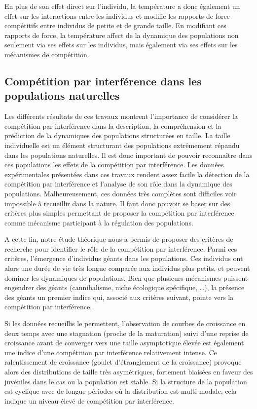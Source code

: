 En plus de son effet direct sur l'individu, la température a donc également un
effet sur les interactions entre les individus et modifie les rapports de force
compétitifs entre individus de petite et de grande taille. En modifiant ces
rapports de force, la température affect de la dynamique des populations non
seulement via ses effets sur les individus, mais également via ses effets sur
les mécanismes de compétition. 

\subsection{Compétition par interférence dans les populations
naturelles}

Les différents résultats de ces travaux montrent l'importance de considérer la
compétition par interférence dans la description, la compréhension et la
prédiction de la dynamiques des populations structurées en taille. La taille
individuelle est un élément structurant des populations extrêmement répandu dans
les populations naturelles. Il est donc important de pouvoir reconnaître dans
ces populations les effets de la compétition par interférence. Les données
expérimentales présentées dans ces travaux rendent assez facile la détection de
la compétition par interférence et l'analyse de son rôle dans la dynamique des
populations. Malheureusement, ces données très complètes sont difficiles voir
impossible à recueillir dans la nature. Il faut donc pouvoir se baser sur des
critères plus simples permettant de proposer la compétition par interférence
comme mécanisme participant à la régulation des populations. 

A cette fin, notre étude théorique nous a permis de proposer des critères de
recherche pour identifier le rôle de la compétition par interférence. Parmi ces
critères, l'émergence d'individus géants dans les populations. Ces individus ont
alors une durée de vie très longue comparée aux individus plus petits, et
peuvent dominer les dynamiques de populations. Bien que plusieurs mécanismes
puissent engendrer des géants (cannibalisme, niche écologique spécifique,
\ldots), la présence des géants un premier indice qui, associé aux critères
suivant, pointe vers la compétition par interférence.

Si les données recueillis le permettent, l'observation de courbes de croissance
en deux temps avec une stagnation (proche de la maturation) suivi d'une reprise
de croissance avant de converger vers une taille asymptotique élevée est
également une indice d'une compétition par interférence relativement intense. Ce
ralentissement de croissance (goulet d'étranglement de la croissance) provoque
alors des distributions de taille très asymétriques, fortement biaisées en
faveur des juvéniles dans le cas ou la population est stable. Si la structure de
la population est cyclique avec de longue périodes où la distribution est
multi-modale, cela indique un niveau élevé de compétition par interférence. 


